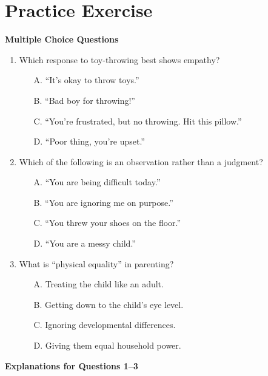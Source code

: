\section{Practice Exercise}
\begin{practiceexercise}
\textbf{Multiple Choice Questions}

\begin{enumerate}
    \item Which response to toy-throwing best shows empathy?
    \begin{itemize}
        \item[A.] ``It's okay to throw toys.''
        \item[B.] ``Bad boy for throwing!''
        \item[C.] ``You're frustrated, but no throwing. Hit this pillow.''
        \item[D.] ``Poor thing, you're upset.''
    \end{itemize}
    \vspace{\fill}

    \item Which of the following is an observation rather than a judgment?
    \begin{itemize}
        \item[A.] ``You are being difficult today.''
        \item[B.] ``You are ignoring me on purpose.''
        \item[C.] ``You threw your shoes on the floor.''
        \item[D.] ``You are a messy child.''
    \end{itemize}
    \vspace{\fill}

    \item What is ``physical equality'' in parenting?
    \begin{itemize}
        \item[A.] Treating the child like an adult.
        \item[B.] Getting down to the child's eye level.
        \item[C.] Ignoring developmental differences.
        \item[D.] Giving them equal household power.
    \end{itemize}
\end{enumerate}
\vspace{\fill}
\newpage

\textbf{Explanations for Questions 1--3}


\end{practiceexercise}
